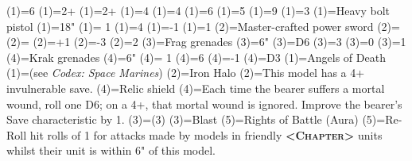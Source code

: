 \renewcommand{\UnitName}{Primaris Captain }%
\renewcommand{\UnitPower}{5}%
\renewcommand{\UnitIcon}{HQ.svg}%
%
\renewcommand{\StatBlocks}{1}%
\Movement(1)={6}%
\WeaponSkill(1)={2+}%
\BalisticSkill(1)={2+}%
\Strength(1)={4}%
\Toughness(1)={4}%
\Wounds(1)={6}%
\Attacks(1)={5}%
\Leadership(1)={9}%
\Save(1)={3}%
%
\renewcommand{\UnitText}{1 \UnitName equipted with: \WeaponName(1); \WeaponName(2); \WeaponName(3); \WeaponName(4); and \AbilityName(4).}%
%
%
\renewcommand{\NumWeapon}{4}%
\WeaponName(1)={Heavy bolt pistol}%
\WeaponRange(1)={18"}%
\WeaponType(1)={ 1}%
\WeaponStrength(1)={4}%
\WeaponAP(1)={-1}%
\WeaponDamage(1)={1}%
%
\WeaponName(2)={Master-crafted power sword}%
\WeaponRange(2)={}%
\WeaponType(2)={}%
\WeaponStrength(2)={+1}%
\WeaponAP(2)={-3}%
\WeaponDamage(2)={2}%
%
\WeaponName(3)={Frag grenades}%
\WeaponRange(3)={6"}%
\WeaponType(3)={D6}%
\WeaponStrength(3)={3}%
\WeaponAP(3)={0}%
\WeaponDamage(3)={1}%
%
\WeaponName(4)={Krak grenades}%
\WeaponRange(4)={6"}%
\WeaponType(4)={ 1}%
\WeaponStrength(4)={6}%
\WeaponAP(4)={-1}%
\WeaponDamage(4)={D3}%
%
\renewcommand{\NumAbilities}{3}%
\AbilityName(1)={Angels of Death}%
\AbilityDescription(1)={(see \textit{Codex: Space Marines})}%
%
\AbilityName(2)={Iron Halo}%
\AbilityDescription(2)={This model has a 4+ invulnerable save.}%
%
\AbilityName(4)={Relic shield}%
\AbilityDescription(4)={Each time the bearer suffers a mortal wound, roll one D6; on a 4+, that mortal wound is ignored.  Improve the bearer's Save characteristic by 1.}%
%
\AbilityName(3)={\WeaponName(3)}%
\AbilityDescription(3)={Blast}%
%
\AbilityName(5)={Rights of Battle (Aura)}%
\AbilityDescription(5)={Re-Roll hit rolls of 1 for attacks made by models in friendly \textbf{\textsc{<Chapter>}} units whilst their unit is within 6" of this model.}%
%
\renewcommand{\FactionKeywords}{Imperium, Adeptus Astartes, <Chapter>}%
\renewcommand{\Keywords}{Infantry, Character, \UnitName}%
%
\newcommand{\ExtraFrontTitle}{\AbilityName(5)}%
\renewcommand{\ExtraFrontText}{\AbilityDescription(5)}%
\newcommand{\ExtraBackTitle}{\AbilityName(4)}%
\renewcommand{\ExtraBackText}{\AbilityDescription(4)}%
\endinput%